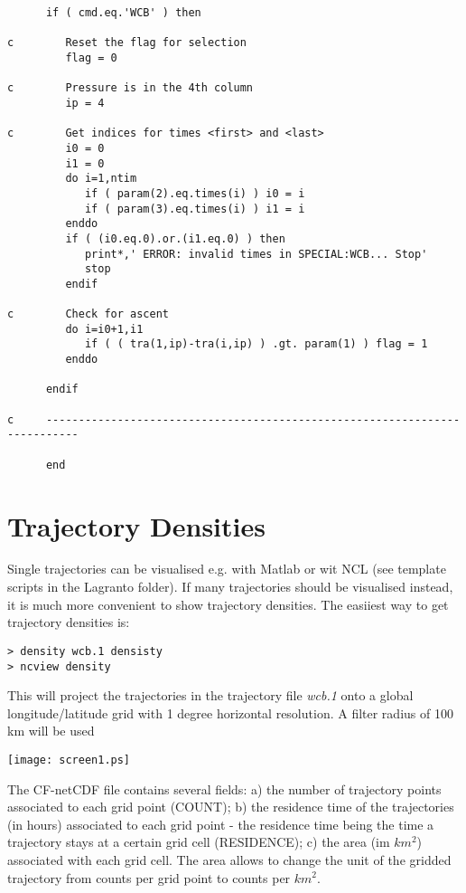 \documentclass[a4paper,10pt]{article}
\begin{document}
\begin{itemize}
\begin{small}
\begin{verbatim}
      if ( cmd.eq.'WCB' ) then

c        Reset the flag for selection
         flag = 0

c        Pressure is in the 4th column
         ip = 4

c        Get indices for times <first> and <last>
         i0 = 0
         i1 = 0
         do i=1,ntim
            if ( param(2).eq.times(i) ) i0 = i
            if ( param(3).eq.times(i) ) i1 = i
         enddo
         if ( (i0.eq.0).or.(i1.eq.0) ) then
            print*,' ERROR: invalid times in SPECIAL:WCB... Stop'
            stop
         endif

c        Check for ascent 
         do i=i0+1,i1
            if ( ( tra(1,ip)-tra(i,ip) ) .gt. param(1) ) flag = 1
         enddo

      endif

c     ---------------------------------------------------------------------------

      end
\end{verbatim}
\end{small}

\end{itemize}

\section{Trajectory Densities}
Single trajectories can be visualised e.g. with Matlab or wit NCL (see template scripts in the Lagranto folder). If many trajectories should be visualised instead, it is much more convenient to show trajectory densities. The easiiest way to get trajectory densities is:
\begin{verbatim}
> density wcb.1 densisty
> ncview density 
\end{verbatim}
This will project the trajectories in the trajectory file {\em wcb.1} onto a global longitude/latitude grid with 1 degree horizontal resolution. A filter radius of 100 km will be used

\texttt{[image: screen1.ps]}

\noindent
The CF-netCDF file contains several fields: a) the number of trajectory points associated to each grid point (COUNT); b) the residence time of the trajectories (in hours) associated to each grid point - the residence time being the time a trajectory stays at a certain grid cell (RESIDENCE); c) the area (im $km^2$) associated with each grid cell. The area allows to change the unit of the gridded trajectory from counts per grid point to counts per $km^2$.\\
\end{document}
